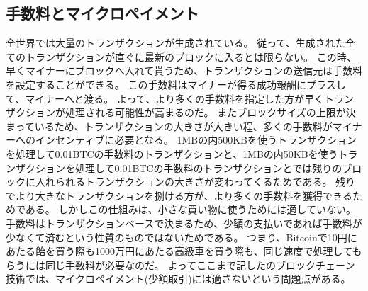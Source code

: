 \subsection{手数料とマイクロペイメント}
全世界では大量のトランザクションが生成されている。
従って、生成された全てのトランザクションが直ぐに最新のブロックに入るとは限らない。
この時、早くマイナーにブロックへ入れて貰うため、トランザクションの送信元は手数料を設定することができる。
この手数料はマイナーが得る成功報酬にプラスして、マイナーへと渡る。
よって、より多くの手数料を指定した方が早くトランザクションが処理される可能性が高まるのだ。
またブロックサイズの上限が決まっているため、トランザクションの大きさが大きい程、多くの手数料がマイナーへのインセンティブに必要となる。
1MBの内500KBを使うトランザクションを処理して0.01BTCの手数料のトランザクションと、1MBの内50KBを使うトランザクションを処理して0.01BTCの手数料のトランザクションとでは残りのブロックに入れられるトランザクションの大きさが変わってくるためである。
残りでより大きなトランザクションを捌ける方が、より多くの手数料を獲得できるためである。
しかしこの仕組みは、小さな買い物に使うためには適していない。
手数料はトランザクションベースで決まるため、少額の支払いであれば手数料が少なくて済むという性質のものではないためである。
つまり、Bitcoinで10円にあたる飴を買う際も1000万円にあたる高級車を買う際も、同じ速度で処理してもらうには同じ手数料が必要なのだ。
よってここまで記したのブロックチェーン技術では、マイクロペイメント(少額取引)には適さないという問題点がある。

